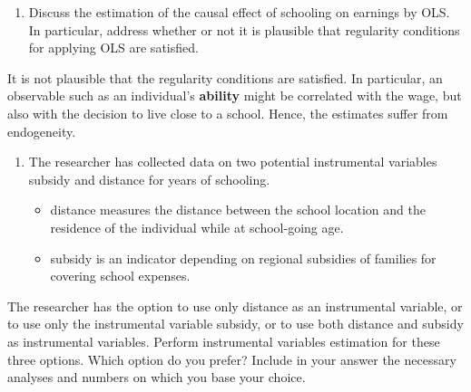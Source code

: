 \documentclass[
]{article}
\providecommand{\tightlist}{%
  \setlength{\itemsep}{0pt}\setlength{\parskip}{0pt}}
\begin{document}
\begin{enumerate}
\def\labelenumi{(\alph{enumi})}
\tightlist
\item
  Discuss the estimation of the causal effect of schooling on earnings
  by OLS. In particular, address whether or not it is plausible that
  regularity conditions for applying OLS are satisfied.
\end{enumerate}

It is not plausible that the regularity conditions are satisfied. In
particular, an observable such as an individual's \textbf{ability} might
be correlated with the wage, but also with the decision to live close to
a school. Hence, the estimates suffer from endogeneity.

\begin{enumerate}
\def\labelenumi{(\alph{enumi})}
\setcounter{enumi}{1}
\tightlist
\item
  The researcher has collected data on two potential instrumental
  variables subsidy and distance for years of schooling.

  \begin{itemize}
  \tightlist
  \item
    distance measures the distance between the school location and the
    residence of the individual while at school-going age.
  \item
    subsidy is an indicator depending on regional subsidies of families
    for covering school expenses.
  \end{itemize}
\end{enumerate}

The researcher has the option to use only distance as an instrumental
variable, or to use only the instrumental variable subsidy, or to use
both distance and subsidy as instrumental variables. Perform
instrumental variables estimation for these three options. Which option
do you prefer? Include in your answer the necessary analyses and numbers
on which you base your choice.
\end{document}
